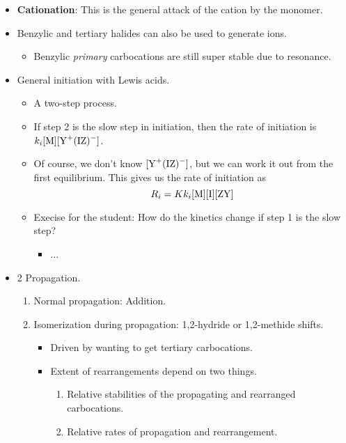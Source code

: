 \documentclass[../notes.tex]{subfiles}
\begin{document}
\begin{itemize}
    \item \textbf{Cationation}: This is the general attack of the cation by the monomer.
    \item Benzylic and tertiary halides can also be used to generate ions.
    \begin{itemize}
        \item Benzylic \emph{primary} carbocations are still super stable due to resonance.
    \end{itemize}
    \item General initiation with Lewis acids.
    \begin{itemize}
        \item A two-step process.
        \item If step 2 is the slow step in initiation, then the rate of initiation is $k_i[\ce{M}][\ce{Y+(IZ)-}]$.
        \item Of course, we don't know $[\ce{Y+(IZ)-}]$, but we can work it out from the first equilibrium. This gives us the rate of initiation as
        \begin{equation*}
            R_i = Kk_i[\ce{M}][\ce{I}][\ce{ZY}]
        \end{equation*}
        \item Execise for the student: How do the kinetics change if step 1 is the slow step?
        \begin{itemize}
            \item ...
        \end{itemize}
    \end{itemize}
    \item 2 Propagation.
    \begin{enumerate}[label={\Alph*)}]
        \item Normal propagation: Addition.
        \item Isomerization during propagation: 1,2-hydride or 1,2-methide shifts.
        \begin{itemize}
            \item Driven by wanting to get tertiary carbocations.
            \item Extent of rearrangements depend on two things.
            \begin{enumerate}[label={\arabic*)}]
                \item Relative stabilities of the propagating and rearranged carbocations.
                \item Relative rates of propagation and rearrangement.
            \end{enumerate}

\end{itemize}
\end{enumerate}
\end{itemize}
\end{document}
